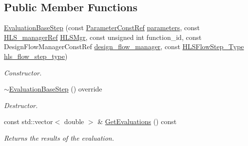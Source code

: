 \subsection*{Public Member Functions}
\begin{DoxyCompactItemize}
\item 
\hyperlink{classEvaluationBaseStep_a342fa9b4206d579b50fc06527387c67e}{Evaluation\+Base\+Step} (const \hyperlink{Parameter_8hpp_a37841774a6fcb479b597fdf8955eb4ea}{Parameter\+Const\+Ref} \hyperlink{classDesignFlowStep_a802eaafe8013df706370679d1a436949}{parameters}, const \hyperlink{hls__manager_8hpp_acd3842b8589fe52c08fc0b2fcc813bfe}{H\+L\+S\+\_\+manager\+Ref} \hyperlink{classHLS__step_ade85003a99d34134418451ddc46a18e9}{H\+L\+S\+Mgr}, const unsigned int function\+\_\+id, const Design\+Flow\+Manager\+Const\+Ref \hyperlink{classDesignFlowStep_ab770677ddf087613add30024e16a5554}{design\+\_\+flow\+\_\+manager}, const \hyperlink{hls__step_8hpp_ada16bc22905016180e26fc7e39537f8d}{H\+L\+S\+Flow\+Step\+\_\+\+Type} \hyperlink{classHLS__step_aefd59af15346ec3f10bf12bd756e6777}{hls\+\_\+flow\+\_\+step\+\_\+type})
\begin{DoxyCompactList}\small\item\em Constructor. \end{DoxyCompactList}\item 
\hyperlink{classEvaluationBaseStep_a0e0f9b8e217918223fff80a768ac16fe}{$\sim$\+Evaluation\+Base\+Step} () override
\begin{DoxyCompactList}\small\item\em Destructor. \end{DoxyCompactList}\item 
const std\+::vector$<$ double $>$ \& \hyperlink{classEvaluationBaseStep_a2c34ab1d7778d72e77afd24865fda871}{Get\+Evaluations} () const
\begin{DoxyCompactList}\small\item\em Returns the results of the evaluation. \end{DoxyCompactList}\end{DoxyCompactItemize}
